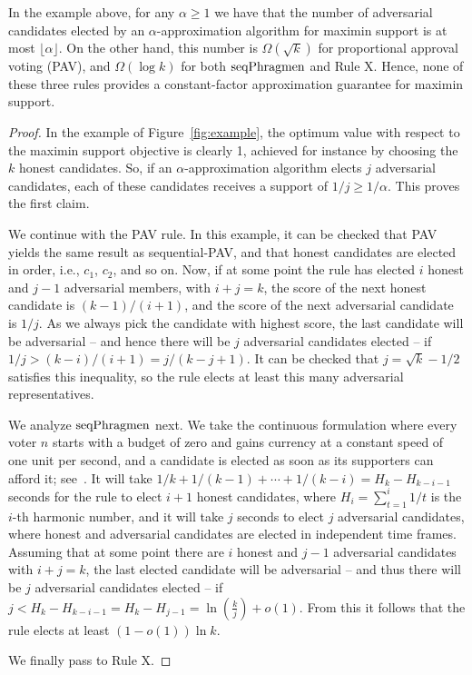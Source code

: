 \begin{lemma}
In the example above, for any $\alpha \geq 1$ we have that the number of adversarial candidates elected by an $\alpha$-approximation algorithm for maximin support is at most $\lfloor \alpha \rfloor$. 
On the other hand, this number is $\Omega(\sqrt{k})$ for proportional approval voting (PAV), and $\Omega(\log k)$ for both $\operatorname{seqPhragmen}$ and Rule X. 
Hence, none of these three rules provides a constant-factor approximation guarantee for maximin support. 
\end{lemma}

\begin{proof}
In the example of Figure~\ref{fig:example}, the optimum value with respect to the maximin support objective is clearly 1, achieved for instance by choosing the $k$ honest candidates. 
So, if an $\alpha$-approximation algorithm elects $j$ adversarial candidates, each of these candidates receives a support of $1/j \geq 1/\alpha$. This proves the first claim.

We continue with the PAV rule. In this example, it can be checked that PAV yields the same result as sequential-PAV, and that honest candidates are elected in order, i.e., $c_1$, $c_2$, and so on. 
Now, if at some point the rule has elected $i$ honest and $j-1$ adversarial members, with $i+j=k$, the score of the next honest candidate is $(k-1)/(i+1)$, and the score of the next adversarial candidate is $1/j$. 
As we always pick the candidate with highest score, the last candidate will be adversarial -- and hence there will be $j$ adversarial candidates elected -- if $1/j > (k-i)/(i+1)=j/(k-j+1)$. 
It can be checked that $j=\sqrt{k}-1/2$ satisfies this inequality, so the rule elects at least this many adversarial representatives. 

We analyze $\operatorname{seqPhragmen}$ next. We take the continuous formulation where every voter $n$ starts with a budget of zero and gains currency at a constant speed of one unit per second, and a candidate is elected as soon as its supporters can afford it; see~\cite{lackner2020approval}.  
It will take $1/k+1/(k-1)+\cdots + 1/(k-i)= H_k - H_{k-i-1}$ seconds for the rule to elect $i+1$ honest candidates, where $H_i=\sum_{t=1}^i 1/t$ is the $i$-th harmonic number, and it will take $j$ seconds to elect $j$ adversarial candidates, where honest and adversarial candidates are elected in independent time frames. 
Assuming that at some point there are $i$ honest and $j-1$ adversarial candidates with $i+j=k$, the last elected candidate will be adversarial -- and thus there will be $j$ adversarial candidates elected -- if $j< H_k - H_{k-i-1} = H_k - H_{j-1}=\ln(\frac{k}{j}) +o(1)$. 
From this it follows that the rule elects at least $(1-o(1)) \ln k$.

We finally pass to Rule X. 
\end{proof}

